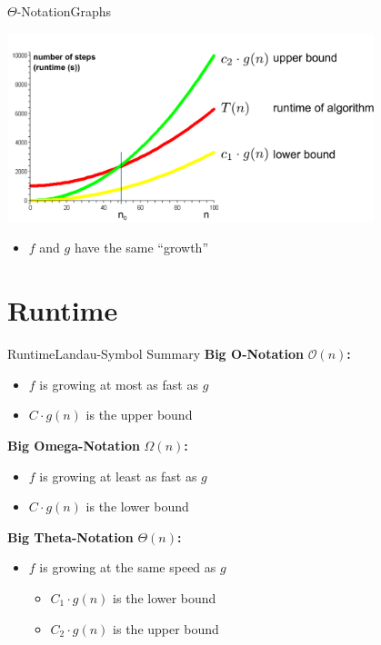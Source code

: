 \begin{frame}{$\Theta$-Notation}{Graphs}
  \begin{center}
    \includegraphics[width=0.8\textwidth]{Images/lower-upper-bound.pdf}
  \end{center}
  \begin{itemize}
    \item $f$ and $g$ have the same ``growth''
  \end{itemize}
\end{frame}

\section{Runtime}


\begin{frame}{Runtime}{Landau-Symbol Summary}
  \textbf{Big O-Notation} $\mathcal{O}(n)$\textbf{:}\\
    \begin{itemize}
      \item
        $f$ is growing {\color{Mittel-Blau}at most} as fast as $g$
      \item
        $C \cdot g(n)$ is the upper bound
    \end{itemize}
  \textbf{Big Omega-Notation} $\Omega(n)$\textbf{:}\\
  \begin{itemize}
    \item
      $f$ is growing {\color{Mittel-Blau}at least} as fast as $g$
    \item
      $C \cdot g(n)$ is the lower bound
  \end{itemize}
  \textbf{Big Theta-Notation} $\Theta(n)$\textbf{:}\\
  \begin{itemize}
    \item
      $f$ is growing at {\color{Mittel-Blau}the same} speed as $g$
      \begin{itemize}
        \item
          $C_1 \cdot g(n)$ is the lower bound
        \item
          $C_2 \cdot g(n)$ is the upper bound
      \end{itemize}
  \end{itemize}
\end{frame}

